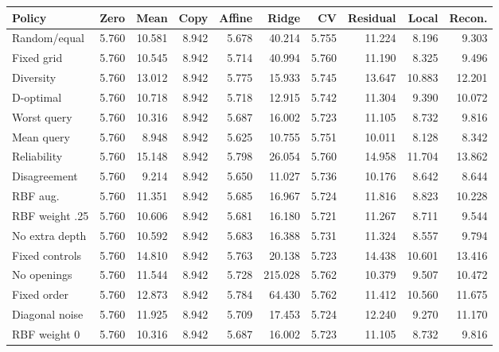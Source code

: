 \begin{tabular}{lrrrrrrrrr}
\toprule
Policy & Zero & Mean & Copy & Affine & Ridge & CV & Residual & Local & Recon. \\
\midrule
Random/equal & 5.760 & 10.581 & 8.942 & 5.678 & 40.214 & 5.755 & 11.224 & 8.196 & 9.303 \\
Fixed grid & 5.760 & 10.545 & 8.942 & 5.714 & 40.994 & 5.760 & 11.190 & 8.325 & 9.496 \\
Diversity & 5.760 & 13.012 & 8.942 & 5.775 & 15.933 & 5.745 & 13.647 & 10.883 & 12.201 \\
D-optimal & 5.760 & 10.718 & 8.942 & 5.718 & 12.915 & 5.742 & 11.304 & 9.390 & 10.072 \\
Worst query & 5.760 & 10.316 & 8.942 & 5.687 & 16.002 & 5.723 & 11.105 & 8.732 & 9.816 \\
Mean query & 5.760 & 8.948 & 8.942 & 5.625 & 10.755 & 5.751 & 10.011 & 8.128 & 8.342 \\
Reliability & 5.760 & 15.148 & 8.942 & 5.798 & 26.054 & 5.760 & 14.958 & 11.704 & 13.862 \\
Disagreement & 5.760 & 9.214 & 8.942 & 5.650 & 11.027 & 5.736 & 10.176 & 8.642 & 8.644 \\
RBF aug. & 5.760 & 11.351 & 8.942 & 5.685 & 16.967 & 5.724 & 11.816 & 8.823 & 10.228 \\
RBF weight .25 & 5.760 & 10.606 & 8.942 & 5.681 & 16.180 & 5.721 & 11.267 & 8.711 & 9.544 \\
No extra depth & 5.760 & 10.592 & 8.942 & 5.683 & 16.388 & 5.731 & 11.324 & 8.557 & 9.794 \\
Fixed controls & 5.760 & 14.810 & 8.942 & 5.763 & 20.138 & 5.723 & 14.438 & 10.601 & 13.416 \\
No openings & 5.760 & 11.544 & 8.942 & 5.728 & 215.028 & 5.762 & 10.379 & 9.507 & 10.472 \\
Fixed order & 5.760 & 12.873 & 8.942 & 5.784 & 64.430 & 5.762 & 11.412 & 10.560 & 11.675 \\
Diagonal noise & 5.760 & 11.925 & 8.942 & 5.709 & 17.453 & 5.724 & 12.240 & 9.270 & 11.170 \\
RBF weight 0 & 5.760 & 10.316 & 8.942 & 5.687 & 16.002 & 5.723 & 11.105 & 8.732 & 9.816 \\
\bottomrule
\end{tabular}
